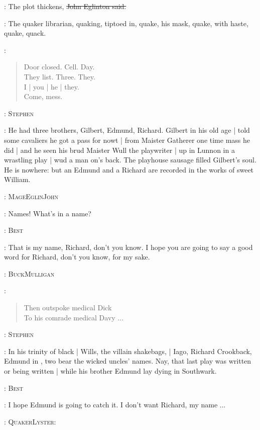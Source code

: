 \eglinton:
The plot thickens,
\sout{John Eglinton said.}

:
The quaker librarian,
quaking,
tiptoed in,
quake,
his mask,
quake,
with haste,
quake,
quack.

\StephenInt:
\begin{verse}
    Door closed. Cell. Day.\\
    They list. Three. They.
 \\
    I | you | he | they.\\
    Come, mess.
\end{verse}

:
{\textsc{Stephen}}

\Stephen:
He had three brothers,
Gilbert,
Edmund,
Richard.
Gilbert in his old age |
told some cavaliers he got a pass for nowt |
from Maister Gatherer one time mass he did |
and he seen his brud Maister Wull the playwriter |
up in Lunnon in a wrastling play |
wud a man on's back.
The playhouse sausage filled Gilbert's soul.
He is nowhere:
but an Edmund and a Richard are recorded in the works of sweet William.

:
{\textsc{MageEglinJohn}}

\eglinton:
Names!
What's in a name?

:
{\textsc{Best}}

\best:
That is my name,
Richard,
don't you know.
I hope you are going to say a good word for Richard,
don't you know,
for my sake.


:
{\textsc{BuckMulligan}}

\mulligan:
\begin{verse}
         Then outspoke medical Dick \\
         To his comrade medical Davy ...
\end{verse}

:
{\textsc{Stephen}}

\Stephen:
In his trinity of black |
Wills,
the villain shakebags, |
Iago,
Richard Crookback,
Edmund in ,
two bear the wicked uncles' names.
Nay,
that last play was written or being written |
while his brother Edmund lay dying in Southwark.

:
{\textsc{Best}}

\best:
I hope Edmund is going to catch it.
I don't want Richard, my name ...


:
{\textsc{QuakerLyster:}}

